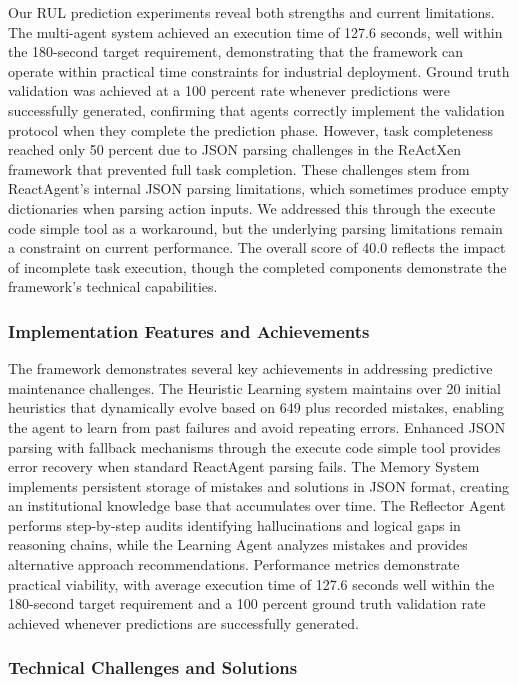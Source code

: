 \documentclass[conference]{IEEEtran}
\begin{document}
Our RUL prediction experiments reveal both strengths and current limitations. The multi-agent system achieved an execution time of 127.6 seconds, well within the 180-second target requirement, demonstrating that the framework can operate within practical time constraints for industrial deployment. Ground truth validation was achieved at a 100 percent rate whenever predictions were successfully generated, confirming that agents correctly implement the validation protocol when they complete the prediction phase. However, task completeness reached only 50 percent due to JSON parsing challenges in the ReActXen framework that prevented full task completion. These challenges stem from ReactAgent's internal JSON parsing limitations, which sometimes produce empty dictionaries when parsing action inputs. We addressed this through the execute code simple tool as a workaround, but the underlying parsing limitations remain a constraint on current performance. The overall score of 40.0 reflects the impact of incomplete task execution, though the completed components demonstrate the framework's technical capabilities.

\subsubsection{Implementation Features and Achievements}

The framework demonstrates several key achievements in addressing predictive maintenance challenges. The Heuristic Learning system maintains over 20 initial heuristics that dynamically evolve based on 649 plus recorded mistakes, enabling the agent to learn from past failures and avoid repeating errors. Enhanced JSON parsing with fallback mechanisms through the execute code simple tool provides error recovery when standard ReactAgent parsing fails. The Memory System implements persistent storage of mistakes and solutions in JSON format, creating an institutional knowledge base that accumulates over time. The Reflector Agent performs step-by-step audits identifying hallucinations and logical gaps in reasoning chains, while the Learning Agent analyzes mistakes and provides alternative approach recommendations. Performance metrics demonstrate practical viability, with average execution time of 127.6 seconds well within the 180-second target requirement and a 100 percent ground truth validation rate achieved whenever predictions are successfully generated.

\subsubsection{Technical Challenges and Solutions}
\end{document}
